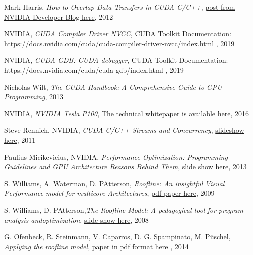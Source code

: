 \documentclass[12pt]{report}
\begin{document}
\begin{thebibliography}{9}
		Mark Harris, \textit{How to Overlap Data Transfers in CUDA C/C++}, \href{https://devblogs.nvidia.com/how-overlap-data-transfers-cuda-cc/}{post from NVIDIA Developer Blog here}, 2012
		
		NVIDIA, \textit{CUDA Compiler Driver NVCC}, CUDA Toolkit Documentation:\\ 
		https://docs.nvidia.com/cuda/cuda-compiler-driver-nvcc/index.html , 2019
		
		NVIDIA, \textit{CUDA-GDB: CUDA debugger}, CUDA Toolkit Documentation:\\ 
		https://docs.nvidia.com/cuda/cuda-gdb/index.html , 2019
		
		Nicholas Wilt, \textit{The CUDA Handbook: A Comprehensive Guide to GPU Programming}, 2013
		
		
		NVIDIA, \textit{NVIDIA Tesla P100}, \href{https://images.nvidia.com/content/pdf/tesla/whitepaper/pascal-architecture-whitepaper.pdf}{The technical whitepaper is available here}, 2016
		
		
		Steve Rennich, NVIDIA, \textit{CUDA C/C++ Streams and Concurrency}, 		\href{https://developer.download.nvidia.com/CUDA/training/\\
			StreamsAndConcurrencyWebinar.pdf}{slideshow here}, 2011
		
		
		Paulius Micikevicius, NVIDIA, \textit{Performance Optimization: Programming Guidelines and GPU Architecture Reasons Behind Them}, \href{http://on-demand.gputechconf.com/gtc/2013/presentations/S3466-Programming-Guidelines-GPU-Architecture.pdf}{slide show here}, 2013
		
		S. Williams, A. Waterman, D. PAtterson, \textit{Roofline:  An insightful Visual Performance model for multicore Architectures}, \href{http://citeseerx.ist.psu.edu/viewdoc/download?doi=10.1.1.156.756\&rep=rep1\&type=pdf}{pdf paper here}, 2009
		
		S. Williams, D. PAtterson,\textit{The Roofline Model: A pedagogical tool for program analysis andoptimization}, \href{https://crd.lbl.gov/assets/pubs\_presos/parlab08-roofline-talk.pdf}{slide show here}, 2008
		
		G. Ofenbeck, R. Steinmann, V. Caparros, D. G. Spampinato, M. Püschel, \textit{Applying the roofline model},  \href{http://spiral.ece.cmu.edu:8080/pub-spiral/pubfile/ispass-2013\_177.pdf}{paper in pdf format here}  , 2014
		

\end{thebibliography}
\end{document}
